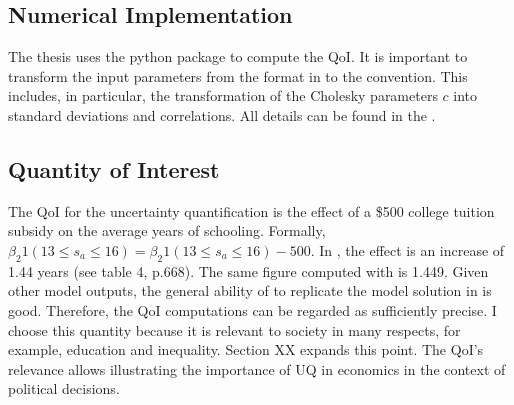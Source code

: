 \documentclass[a4paper,12pt]{article}
\begin{document}
\subsection{Numerical Implementation}

The thesis uses the python package \textit{} to compute the QoI. It is important to transform the input parameters from the format in \cite{Keane.1994} to the  convention. This includes, in particular, the transformation of the Cholesky parameters $c$ into standard deviations and correlations. All details can be found in the  .

\subsection{Quantity of Interest}

The QoI for the uncertainty quantification is the effect of a \$500 college tuition subsidy on the average years of schooling. Formally, $\beta_2 1(13 \leq s_a \leq 16) = \beta_2 1(13 \leq s_a \leq 16) - 500$. In \cite{Keane.1994}, the effect is an increase of 1.44 years (see table 4, p.668). The same figure computed with  is 1.449. Given other model outputs, the general ability of  to replicate the model solution in \cite{Keane.1994} is good. Therefore, the QoI computations can be regarded as sufficiently precise. I choose this quantity because it is relevant to society in many respects, for example, education and inequality. Section XX expands this point. The QoI's relevance allows illustrating the importance of UQ in economics in the context of political decisions.

\newpage

\end{document}
